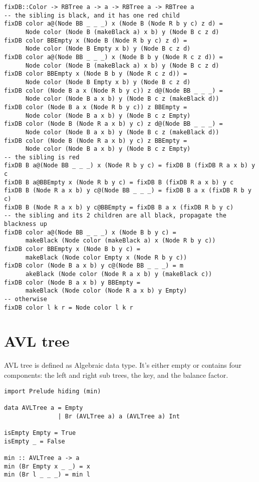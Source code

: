\documentclass{article}
\begin{document}
\begin{lstlisting}[caption=Red-black tree deletion algorithm with the concept of 'doubly black'.]
fixDB::Color -> RBTree a -> a -> RBTree a -> RBTree a
-- the sibling is black, and it has one red child
fixDB color a@(Node BB _ _ _) x (Node B (Node R b y c) z d) =
      Node color (Node B (makeBlack a) x b) y (Node B c z d)
fixDB color BBEmpty x (Node B (Node R b y c) z d) =
      Node color (Node B Empty x b) y (Node B c z d)
fixDB color a@(Node BB _ _ _) x (Node B b y (Node R c z d)) =
      Node color (Node B (makeBlack a) x b) y (Node B c z d)
fixDB color BBEmpty x (Node B b y (Node R c z d)) =
      Node color (Node B Empty x b) y (Node B c z d)
fixDB color (Node B a x (Node R b y c)) z d@(Node BB _ _ _) =
      Node color (Node B a x b) y (Node B c z (makeBlack d))
fixDB color (Node B a x (Node R b y c)) z BBEmpty =
      Node color (Node B a x b) y (Node B c z Empty)
fixDB color (Node B (Node R a x b) y c) z d@(Node BB _ _ _) =
      Node color (Node B a x b) y (Node B c z (makeBlack d))
fixDB color (Node B (Node R a x b) y c) z BBEmpty =
      Node color (Node B a x b) y (Node B c z Empty)
-- the sibling is red
fixDB B a@(Node BB _ _ _) x (Node R b y c) = fixDB B (fixDB R a x b) y c
fixDB B a@BBEmpty x (Node R b y c) = fixDB B (fixDB R a x b) y c
fixDB B (Node R a x b) y c@(Node BB _ _ _) = fixDB B a x (fixDB R b y c)
fixDB B (Node R a x b) y c@BBEmpty = fixDB B a x (fixDB R b y c)
-- the sibling and its 2 children are all black, propagate the blackness up
fixDB color a@(Node BB _ _ _) x (Node B b y c) =
      makeBlack (Node color (makeBlack a) x (Node R b y c))
fixDB color BBEmpty x (Node B b y c) =
      makeBlack (Node color Empty x (Node R b y c))
fixDB color (Node B a x b) y c@(Node BB _ _ _) = m
      akeBlack (Node color (Node R a x b) y (makeBlack c))
fixDB color (Node B a x b) y BBEmpty =
      makeBlack (Node color (Node R a x b) y Empty)
-- otherwise
fixDB color l k r = Node color l k r
\end{lstlisting}

\section{AVL tree}

AVL tree is defined as Algebraic data type. It's either empty or contains four
components: the left and right sub trees, the key, and the balance factor.

\begin{lstlisting}[caption=Algebraic AVL tree definition]
import Prelude hiding (min)

data AVLTree a = Empty
               | Br (AVLTree a) a (AVLTree a) Int

isEmpty Empty = True
isEmpty _ = False

min :: AVLTree a -> a
min (Br Empty x _ _) = x
min (Br l _ _ _) = min l
\end{lstlisting}
\end{document}

